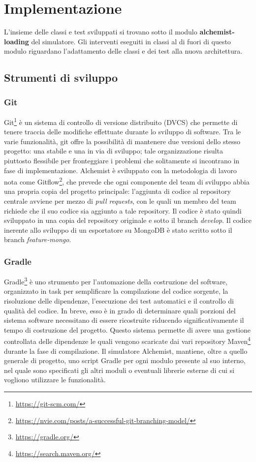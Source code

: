 \documentclass[12pt,a4paper,openright,oneside]{book}
\begin{document}
    \section{Implementazione}
    L'insieme delle classi e test sviluppati si trovano sotto il modulo \textbf{alchemist-loading} del simulatore. Gli interventi eseguiti in classi al di fuori di questo modulo riguardano l'adattamento delle classi e dei test alla nuova architettura.
    
\subsection{Strumenti di sviluppo}

    \subsubsection{\textbf{Git}}
    Git\footnote{\url{https://git-scm.com/}} è un sistema di controllo di versione distribuito (DVCS) che permette di tenere traccia delle modifiche effettuate durante lo sviluppo di software. Tra le varie funzionalità, git offre la possibilità di mantenere due versioni dello stesso progetto: una stabile e una in via di sviluppo; tale organizzazione risulta piuttosto flessibile per fronteggiare i problemi che solitamente si incontrano in fase di implementazione. Alchemist è sviluppato con la metodologia di lavoro nota come Gitflow\footnote{\url{https://nvie.com/posts/a-successful-git-branching-model/}}, che prevede che ogni componente del team di sviluppo abbia una propria copia del progetto principale: l'aggiunta di codice al repository centrale avviene per mezzo di \emph{pull requests}, con le quali un membro del team richiede che il suo codice sia aggiunto a tale repository.
    Il codice è stato quindi sviluppato in una copia del repository originale e sotto il branch \textit{develop}.
    Il codice inerente allo sviluppo di un esportatore su MongoDB è stato scritto sotto il branch \textit{feature-mongo}.
    
    \subsubsection{\textbf{Gradle}}
    Gradle\footnote{\url{https://gradle.org/}} è uno strumento per l’automazione della costruzione del software, organizzato in task per semplificare la compilazione del codice sorgente, la risoluzione delle dipendenze, l’esecuzione dei test automatici e il controllo di qualità del codice. In breve, esso è in grado di determinare quali porzioni del sistema software necessitano di essere ricostruite riducendo significativamente il tempo di costruzione del progetto. Questo sistema permette di avere una gestione controllata delle dipendenze le quali vengono scaricate dai vari repository Maven\footnote{\url{https://search.maven.org/}} durante la fase di compilazione. Il simulatore Alchemist, mantiene, oltre a quello generale di progetto, uno script Gradle per ogni modulo presente al suo interno, nel quale sono specificati gli altri moduli o eventuali librerie esterne di cui si vogliono utilizzare le funzionalità.
    
\end{document}
